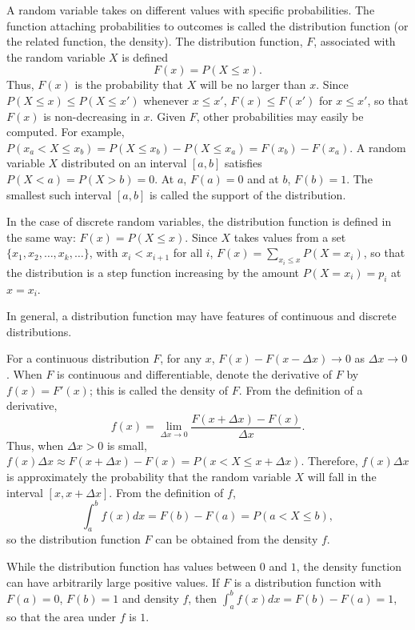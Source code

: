 \begin{original}
A random variable takes on different values with specific probabilities. The function attaching probabilities to outcomes is called the distribution function (or the related function, the density). The distribution function, $F$, associated with the random variable $X$ is defined
\[
F(x) = P(X \leq x). \tag{18.1}
\]
Thus, $F(x)$ is the probability that $X$ will be no larger than $x$. Since $P(X \leq x) \leq P(X \leq x')$ whenever $x \leq x'$, $F(x) \leq F(x')$ for $x \leq x'$, so that $F(x)$ is non-decreasing in $x$. Given $F$, other probabilities may easily be computed. For example, $P(x_a < X \leq x_b) = P(X \leq x_b) - P(X \leq x_a) = F(x_b) - F(x_a)$. A random variable $X$ distributed on an interval $[a, b]$ satisfies $P(X < a) = P(X > b) = 0$. At $a$, $F(a) = 0$ and at $b$, $F(b) = 1$. The smallest such interval $[a, b]$ is called the support of the distribution.

In the case of discrete random variables, the distribution function is defined in the same way: $F(x) = P(X \leq x)$. Since $X$ takes values from a set $\{x_1, x_2, \ldots, x_k, \ldots\}$, with $x_i < x_{i+1}$ for all $i$, $F(x) = \sum_{x_i \leq x} P(X = x_i)$, so that the distribution is a step function increasing by the amount $P(X = x_i) = p_i$ at $x = x_i$.

In general, a distribution function may have features of continuous and discrete distributions.

For a continuous distribution $F$, for any $x$, $F(x) - F(x - \Delta x) \to 0$ as $\Delta x \to 0$. When $F$ is continuous and differentiable, denote the derivative of $F$ by $f(x) = F'(x)$; this is called the density of $F$. From the definition of a derivative,
\[
f(x) = \lim_{\Delta x \to 0} \frac{F(x + \Delta x) - F(x)}{\Delta x}.
\]
Thus, when $\Delta x > 0$ is small, $f(x)\Delta x \approx F(x + \Delta x) - F(x) = P(x < X \leq x + \Delta x)$. Therefore, $f(x)\Delta x$ is approximately the probability that the random variable $X$ will fall in the interval $[x, x + \Delta x]$. From the definition of $f$,
\[
\int_a^b f(x)dx = F(b) - F(a) = P(a < X \leq b),
\]
so the distribution function $F$ can be obtained from the density $f$.

While the distribution function has values between $0$ and $1$, the density function can have arbitrarily large positive values. If $F$ is a distribution function with $F(a) = 0$, $F(b) = 1$ and density $f$, then $\int_a^b f(x)dx = F(b) - F(a) = 1$, so that the area under $f$ is $1$.
\end{original}
